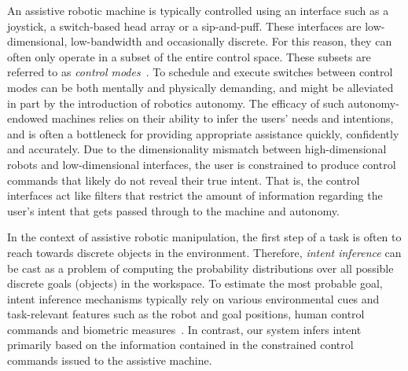 \documentclass[conference]{IEEEtran}
\begin{document}
An assistive robotic machine is typically controlled using an interface such as a joystick, a switch-based head array or a sip-and-puff. These interfaces are low-dimensional, low-bandwidth and occasionally discrete. For this reason, they can often only operate in a subset of the entire control space. These subsets are referred to as \textit{control modes}~\citep{simpson2008tooth}. To schedule and execute switches between control modes can be both mentally and physically demanding, and might be alleviated in part by the introduction of robotics autonomy. The efficacy of such autonomy-endowed machines relies on their ability to infer the users' needs and intentions, and is often a bottleneck for providing appropriate assistance quickly, confidently and accurately. Due to the dimensionality mismatch between high-dimensional robots and low-dimensional interfaces, the user is constrained to produce control commands that likely do not reveal their true intent. That is, the control interfaces act like filters that restrict the amount of information regarding the user's intent that gets passed through to the machine and autonomy. 

In the context of assistive robotic manipulation, the first step of a task is often to reach towards discrete objects in the environment. Therefore, \textit{intent inference} can be cast as a problem of computing the probability distributions over all possible discrete goals (objects) in the workspace. To estimate the most probable goal, intent inference mechanisms typically rely on various environmental cues and task-relevant features such as the robot and goal positions, human control commands and biometric measures~\citep{croft2003estimating}. In contrast, our system infers intent primarily based on the information contained in the constrained control commands issued to the assistive machine. 
\end{document}

